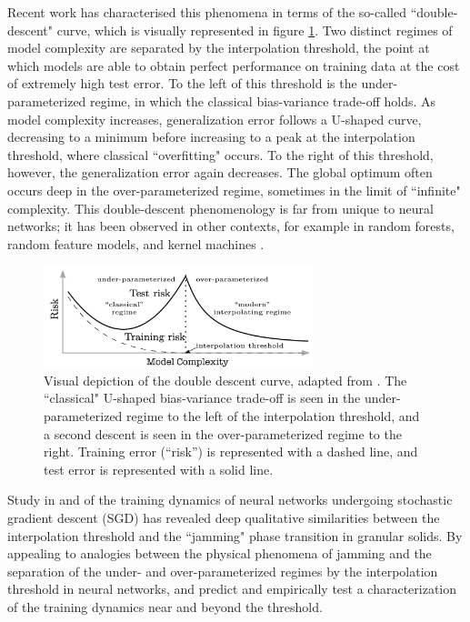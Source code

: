 \documentclass[a4paper, 12pt]{article}
\begin{document}
Recent work \cite{belkinReconcilingModernMachine2019} has characterised this phenomena in terms of the so-called ``double-descent" curve, which is visually represented in figure \ref{doubledescent}. Two distinct regimes of model complexity are separated by the interpolation threshold, the point at which models are able to obtain perfect performance on training data at the cost of extremely high test error. To the left of this threshold is the under-parameterized regime, in which the classical bias-variance trade-off holds. As model complexity increases, generalization error follows a U-shaped curve, decreasing to a minimum before increasing to a peak at the interpolation threshold, where classical ``overfitting" occurs. To the right of this threshold, however, the generalization error again decreases. The global optimum often occurs deep in the over-parameterized regime, sometimes in the limit of ``infinite" complexity. This double-descent phenomenology is far from unique to neural networks; it has been observed in other contexts, for example in random forests, random feature models, and kernel machines \cite{ belkinReconcilingModernMachine2019, belkinUnderstandDeepLearning2018}.\\

\begin{figure}[h]
\centering
\includegraphics[width=0.7\textwidth]{docs/assets/double_descent_reconciling.png}
\caption{Visual depiction of the double descent curve, adapted from \cite{belkinReconcilingModernMachine2019}. The ``classical" U-shaped bias-variance trade-off is seen in the under-parameterized regime to the left of the interpolation threshold, and a second descent is seen in the over-parameterized regime to the right. Training error (``risk'') is represented with a dashed line, and test error is represented with a solid line.}
\label{doubledescent}
\end{figure}


Study in \cite{baity-jesiComparingDynamicsDeep2019} and \cite{geigerJammingTransitionParadigm2019} of the training dynamics of neural networks undergoing stochastic gradient descent (SGD)  has revealed deep qualitative similarities between the interpolation threshold and the ``jamming" phase transition in granular solids. By appealing to analogies between the physical phenomena of jamming and the separation of the under- and over-parameterized regimes by the interpolation threshold in neural networks, \cite{geigerJammingTransitionParadigm2019} and \cite{spiglerJammingTransitionOverparametrization2019} predict and empirically test a characterization of the training dynamics near and beyond the threshold. 
\end{document}
